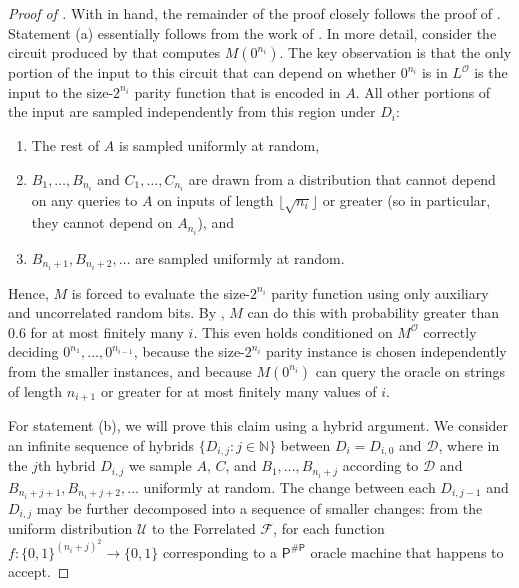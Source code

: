 \documentclass[10pt,a4paper]{article}
\newcommand{\Naturals}{\mathbb{N}}
\begin{document}
\begin{proof}[Proof of ]
With  in hand, the remainder of the proof closely follows the proof of . Statement (a) essentially follows from the work of \cite{Has87}.  In more detail, consider the circuit produced by  that computes $M\left(0^{n_i}\right)$. The key observation is that the only portion of the input to this circuit that can depend on whether $0^{n_i}$ is in $L^\mathcal{O}$ is the input to the size-$2^{n_i}$ parity function that is encoded in $A$. All other portions of the input are sampled independently from this region under $D_i$:
\begin{enumerate}
\item The rest of $A$ is sampled uniformly at random,
\item $B_1,\ldots,B_{n_i}$ and $C_1,\ldots,C_{n_i}$ are drawn from a distribution that cannot depend on any queries to $A$ on inputs of length $\lfloor \sqrt{n_i} \rfloor$ or greater (so in particular, they cannot depend on $A_{n_i}$), and
\item $B_{n_i+1}, B_{n_i + 2},\ldots$ are sampled uniformly at random.
\end{enumerate}
Hence, $M$ is forced to evaluate the size-$2^{n_i}$ parity function using only auxiliary and uncorrelated random bits. By , $M$ can do this with probability greater than 0.6 for at most finitely many $i$. This even holds conditioned on $M^\mathcal{O}$ correctly deciding $0^{n_1},\dots,0^{n_{i-1}}$, because the size-$2^{n_i}$ parity instance is chosen independently from the smaller instances, and because $M\left(0^{n_i}\right)$ can query the oracle on strings of length $n_{i+1}$ or greater for at most finitely many values of $i$.

For statement (b), we will prove this claim using a hybrid argument. We consider an infinite sequence of hybrids $\{D_{i,j} : j \in \Naturals\}$ between $D_i = D_{i,0}$ and $\mathcal{D}$, where in the $j$th hybrid $D_{i,j}$ we sample $A$, $C$, and $B_1,\ldots,B_{n_i + j}$ according to $\mathcal{D}$ and $B_{n_i + j + 1}, B_{n_i + j+2}, \ldots$ uniformly at random. The change between each $D_{i,j-1}$ and $D_{i,j}$ may be further decomposed into a sequence of smaller changes: from the uniform distribution $\mathcal{U}$ to the Forrelated $\mathcal{F}$, for each function $f: \{0,1\}^{(n_i + j)^2} \to \{0,1\}$ corresponding to a $\mathsf{P^{\# P}}$ oracle machine that happens to accept. 


\end{proof}
\end{document}
